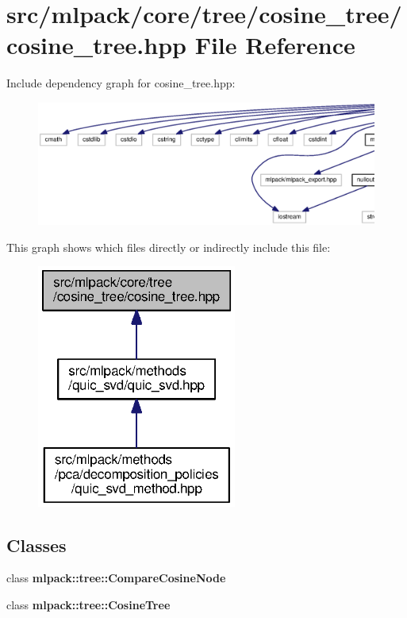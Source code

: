 \section{src/mlpack/core/tree/cosine\+\_\+tree/cosine\+\_\+tree.hpp File Reference}
\label{cosine__tree_8hpp}
Include dependency graph for cosine\+\_\+tree.\+hpp\+:
\nopagebreak
\begin{figure}[H]
\begin{center}
\leavevmode
\includegraphics[width=350pt]{cosine__tree_8hpp__incl}
\end{center}
\end{figure}
This graph shows which files directly or indirectly include this file\+:
\nopagebreak
\begin{figure}[H]
\begin{center}
\leavevmode
\includegraphics[width=186pt]{cosine__tree_8hpp__dep__incl}
\end{center}
\end{figure}
\subsection*{Classes}
\begin{DoxyCompactItemize}
\item 
class {\bf mlpack\+::tree\+::\+Compare\+Cosine\+Node}
\item 
class {\bf mlpack\+::tree\+::\+Cosine\+Tree}
\end{DoxyCompactItemize}
